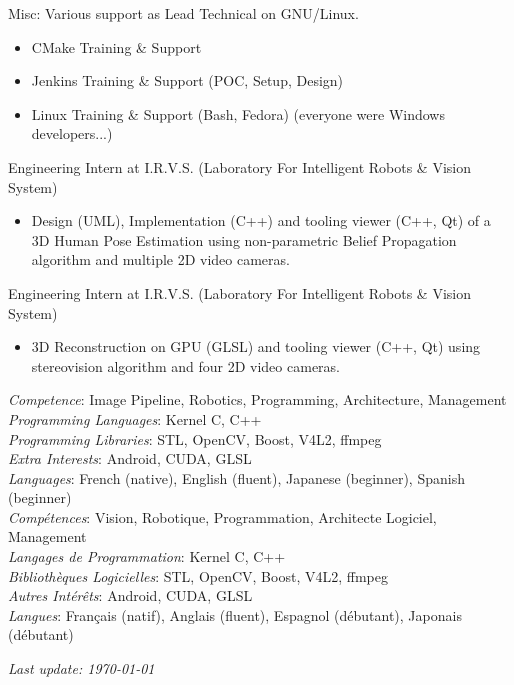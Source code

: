 \documentclass{article}
\begin{document}
\begin{llist}
{Misc:
Various support as Lead Technical on GNU/Linux.
\begin{itemize}
\item CMake Training \& Support
\item Jenkins Training \& Support (POC, Setup, Design)
\item Linux Training \& Support (Bash, Fedora) (everyone were Windows developers...)
\end{itemize}
} {}

 {
Engineering Intern at I.R.V.S. (Laboratory For Intelligent Robots \& Vision System)
\vspace{-0.33cm}
\begin{itemize}
\item Design (UML), Implementation (C++) and tooling viewer (C++, Qt) of a
3D Human Pose Estimation using non-parametric Belief Propagation
algorithm and multiple 2D video cameras.
\end{itemize}
} {}

 {
Engineering Intern at I.R.V.S. (Laboratory For Intelligent Robots \& Vision System)
\vspace{-0.33cm}
\begin{itemize}
\item 3D Reconstruction on GPU (GLSL) and tooling viewer (C++, Qt) using stereovision algorithm and four 2D video cameras.
\end{itemize}
} {}

 {
{\em Competence}: Image Pipeline, Robotics, Programming, Architecture, Management \\
{\em Programming Languages}: Kernel C, C++ \\
{\em Programming Libraries}: STL, OpenCV, Boost, V4L2, ffmpeg \\
{\em Extra Interests}: Android, CUDA, GLSL \\
{\em Languages}: French (native), English (fluent), Japanese (beginner), Spanish
(beginner) \\
} {
{\em Comp\'{e}tences}: Vision, Robotique, Programmation, Architecte Logiciel,
Management \\
{\em Langages de Programmation}: Kernel C, C++ \\
{\em Biblioth\`{e}ques Logicielles}: STL, OpenCV, Boost, V4L2, ffmpeg \\
{\em Autres Int\'{e}r\^{e}ts}: Android, CUDA, GLSL \\
{\em Langues}: Fran\c{c}ais (natif), Anglais (fluent), Espagnol (d\'{e}butant),
Japonais (d\'{e}butant) \\
}


\end{llist}

{\em Last update: \today}
\end{document}
